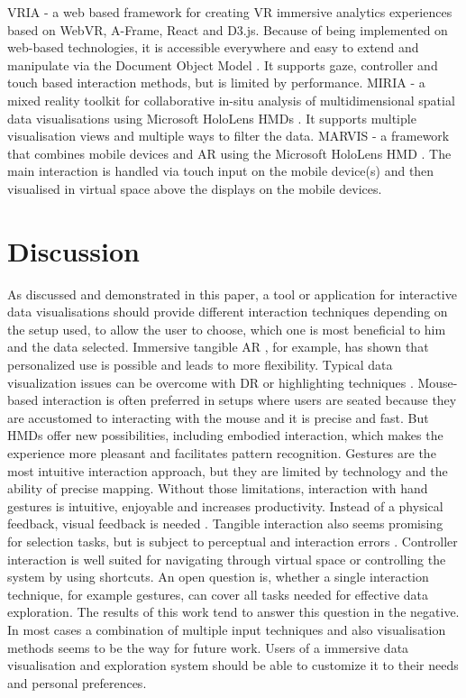 VRIA - a web based framework for creating \ac{VR} immersive analytics experiences based on WebVR, A-Frame, React and D3.js. Because of being implemented on web-based technologies, it is accessible everywhere and easy to extend and manipulate via the Document Object Model \autocite[]{Butcher2020}. It supports gaze, controller and touch based interaction methods, but is limited by performance.\newline
MIRIA - a mixed reality toolkit for collaborative in-situ analysis of multidimensional spatial data visualisations using Microsoft HoloLens \ac{HMD}s \autocite[]{Buschel2021}. It supports multiple visualisation views and multiple ways to filter the data. \newline
MARVIS - a framework that combines mobile devices and \ac{AR} using the Microsoft HoloLens \ac{HMD} \autocite[]{Langner2021}. The main interaction is handled via touch input on the mobile device(s) and then visualised in virtual space above the displays on the mobile devices.
\section{Discussion}
As discussed and demonstrated in this paper, a tool or application for interactive data visualisations should provide different interaction techniques depending on the setup used, to allow the user to choose, which one is most beneficial to him and the data selected. Immersive tangible AR \autocite[]{Bach2018}, for example, has shown that personalized use is possible and leads to more flexibility. Typical data visualization issues can be overcome with \ac{DR} or highlighting techniques \autocite[]{Prouzeau2019}. Mouse-based interaction is often preferred in setups where users are seated because they are accustomed to interacting with the mouse and it is precise and fast. But \ac{HMD}s offer new possibilities, including embodied interaction, which makes the experience more pleasant and facilitates pattern recognition. Gestures are the most intuitive interaction approach, but they are limited by technology and the ability of precise mapping. Without those limitations, interaction with hand gestures is intuitive, enjoyable and increases productivity. Instead of a physical feedback, visual feedback is needed \autocite[]{Theart2017}. Tangible interaction also seems promising for selection tasks, but is subject to perceptual and interaction errors \autocite[]{Bach2018}. Controller interaction is well suited for  navigating through virtual space or controlling the system by using shortcuts.\newline
An open question is, whether a single interaction technique, for example gestures, can cover all tasks needed for effective data exploration. The results of this work tend to answer this question in the negative. In most cases a combination of multiple input techniques and also visualisation methods seems to be the way for future work. Users of a immersive data visualisation and exploration system should be able to customize it to their needs and personal preferences.

